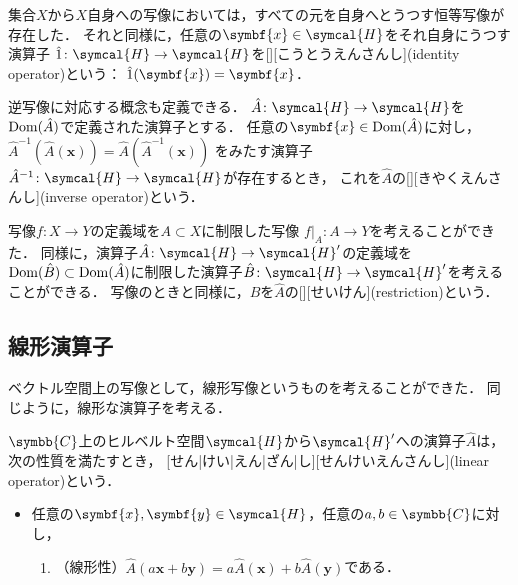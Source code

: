 \documentclass[../sotsu.tex]{subfiles}
\begin{document}
\par

集合$X$から$X$自身への写像においては，すべての元を自身へとうつす恒等写像が存在した．
それと同様に，任意の$\symbf{x} \in \symcal{H}$をそれ自身にうつす演算子
$\idop \colon \symcal{H} \to \symcal{H}$を[][こうとうえんさんし](identity operator)という：
$\idop(\symbf{x}) = \symbf{x}$．

逆写像に対応する概念も定義できる．
$\hat{A} \colon \symcal{H} \to \symcal{H}$を$\operatorname{Dom}(\hat{A})$で定義された演算子とする．
任意の$\symbf{x} \in \domain(\hat{A})$に対し，
$\hat{A}^{-1} ( \hat{A} (\symbf{x}) ) = \hat{A} ( \hat{A}^{-1} (\symbf{x}) ) $
をみたす演算子$\hat{A}^{-1} \colon \symcal{H} \to \symcal{H}$が存在するとき，
これを$\hat{A}$の[][きやくえんさんし](inverse operator)という．

写像$f \colon X \to Y$の定義域を$A \subset X$に制限した写像
$f \vert_A \colon A \to Y$を考えることができた．
同様に，演算子$\hat{A} \colon \symcal{H} \to \symcal{H}'$の定義域を
$\operatorname{Dom}(\hat{B}) \subset \operatorname{Dom}(\hat{A})$に制限した演算子$\hat{B} \colon \symcal{H} \to \symcal{H}'$を考えることができる．
写像のときと同様に，$\hat{B}$を$\hat{A}$の[][せいけん](restriction)という．


\subsection{線形演算子}

ベクトル空間上の写像として，線形写像というものを考えることができた．
同じように，線形な演算子を考える．
\begin{definition}[線形演算子]
    $\symbb{C}$上のヒルベルト空間$\symcal{H}$から$\symcal{H}'$への演算子$\hat{A}$は，次の性質を満たすとき，
    [せん|けい|えん|ざん|し][せんけいえんさんし](linear operator)という．
    \begin{itemize}
        \item 任意の$\symbf{x}, \symbf{y} \in \symcal{H}$，任意の$a, b \in \symbb{C}$に対し，
        \begin{enumerate}
            \item （線形性）$\hat{A}( a \symbf{x} + b \symbf{y} ) = a \hat{A} (\symbf{x}) + b \hat{A} (\symbf{y})$である．
        \end{enumerate}
    \end{itemize}
\end{definition}
\end{document}
